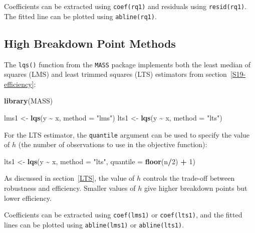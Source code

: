 \documentclass[
  a4paper,
]{article}
\newenvironment{Shaded}{\begin{snugshade}}{\end{snugshade}}
\newcommand{\AttributeTok}[1]{\textcolor[rgb]{0.13,0.29,0.53}{#1}}
\newcommand{\DecValTok}[1]{\textcolor[rgb]{0.00,0.00,0.81}{#1}}
\newcommand{\FunctionTok}[1]{\textcolor[rgb]{0.13,0.29,0.53}{\textbf{#1}}}
\newcommand{\NormalTok}[1]{#1}
\newcommand{\OtherTok}[1]{\textcolor[rgb]{0.56,0.35,0.01}{#1}}
\newcommand{\SpecialCharTok}[1]{\textcolor[rgb]{0.81,0.36,0.00}{\textbf{#1}}}
\newcommand{\StringTok}[1]{\textcolor[rgb]{0.31,0.60,0.02}{#1}}
\theoremstyle{definition}
\theoremstyle{definition}
\theoremstyle{definition}
\theoremstyle{definition}
\theoremstyle{remark}
\begin{document}
Coefficients can be extracted using \texttt{coef(rq1)} and residuals using \texttt{resid(rq1)}.
The fitted line can be plotted using \texttt{abline(rq1)}.

\subsection*{High Breakdown Point Methods}\label{high-breakdown-point-methods}

The \texttt{lqs()} function from the \texttt{MASS} package implements both the least median
of squares (LMS) and least trimmed squares (LTS) estimators from
section~\ref{S19-efficiency}:

\begin{Shaded}
\begin{Highlighting}[]
\FunctionTok{library}\NormalTok{(MASS)}

\NormalTok{lms1 }\OtherTok{\textless{}{-}} \FunctionTok{lqs}\NormalTok{(y }\SpecialCharTok{\textasciitilde{}}\NormalTok{ x, }\AttributeTok{method =} \StringTok{"lms"}\NormalTok{)}
\NormalTok{lts1 }\OtherTok{\textless{}{-}} \FunctionTok{lqs}\NormalTok{(y }\SpecialCharTok{\textasciitilde{}}\NormalTok{ x, }\AttributeTok{method =} \StringTok{"lts"}\NormalTok{)}
\end{Highlighting}
\end{Shaded}

For the LTS estimator, the \texttt{quantile} argument can be used to specify
the value of \(h\) (the number of observations to use in the objective function):

\begin{Shaded}
\begin{Highlighting}[]
\NormalTok{lts1 }\OtherTok{\textless{}{-}} \FunctionTok{lqs}\NormalTok{(y }\SpecialCharTok{\textasciitilde{}}\NormalTok{ x, }\AttributeTok{method =} \StringTok{"lts"}\NormalTok{, }\AttributeTok{quantile =} \FunctionTok{floor}\NormalTok{(n}\SpecialCharTok{/}\DecValTok{2}\NormalTok{) }\SpecialCharTok{+} \DecValTok{1}\NormalTok{)}
\end{Highlighting}
\end{Shaded}

As discussed in section~\ref{LTS}, the value of \(h\) controls the trade-off
between robustness and efficiency. Smaller values of \(h\) give higher breakdown
points but lower efficiency.

Coefficients can be extracted using \texttt{coef(lms1)} or \texttt{coef(lts1)}, and the
fitted lines can be plotted using \texttt{abline(lms1)} or \texttt{abline(lts1)}.
\end{document}
